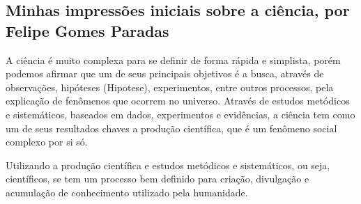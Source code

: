 \subsection{Minhas impressões iniciais sobre a ciência, por Felipe Gomes Paradas}

A ciência é muito complexa para se definir de forma rápida e simplista, porém podemos afirmar que um de seus principais objetivos é a busca, através de observações, hipóteses (\gls{Hipotese}), experimentos, entre outros processos, pela explicação de fenômenos que ocorrem no universo. Através de estudos metódicos e sistemáticos, baseados em dados, experimentos e evidências, a ciência tem como um de seus resultados chaves a produção científica, que é um fenômeno social complexo por si só.

Utilizando a produção científica e estudos metódicos e sistemáticos, ou seja, científicos, se tem um processo bem definido para criação, divulgação e acumulação de conhecimento utilizado pela humanidade.

